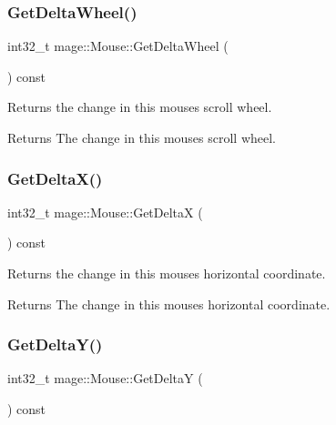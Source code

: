 \subsubsection{\texorpdfstring{Get\+Delta\+Wheel()}{GetDeltaWheel()}}
{\footnotesize\ttfamily int32\+\_\+t mage\+::\+Mouse\+::\+Get\+Delta\+Wheel (\begin{DoxyParamCaption}{ }\end{DoxyParamCaption}) const\hspace{0.3cm}{\ttfamily [noexcept]}}

Returns the change in this mouse\textquotesingle{}s scroll wheel.

\begin{DoxyReturn}{Returns}
The change in this mouse\textquotesingle{}s scroll wheel. 
\end{DoxyReturn}
\hypertarget{classmage_1_1_mouse_a9adb29bd36a28d6caf26017954a5cf7f}{}\label{classmage_1_1_mouse_a9adb29bd36a28d6caf26017954a5cf7f} 
\subsubsection{\texorpdfstring{Get\+Delta\+X()}{GetDeltaX()}}
{\footnotesize\ttfamily int32\+\_\+t mage\+::\+Mouse\+::\+Get\+DeltaX (\begin{DoxyParamCaption}{ }\end{DoxyParamCaption}) const\hspace{0.3cm}{\ttfamily [noexcept]}}

Returns the change in this mouse\textquotesingle{}s horizontal coordinate.

\begin{DoxyReturn}{Returns}
The change in this mouse\textquotesingle{}s horizontal coordinate. 
\end{DoxyReturn}
\hypertarget{classmage_1_1_mouse_a0bf9de248294cacb4635e9eff5b2dc50}{}\label{classmage_1_1_mouse_a0bf9de248294cacb4635e9eff5b2dc50} 
\subsubsection{\texorpdfstring{Get\+Delta\+Y()}{GetDeltaY()}}
{\footnotesize\ttfamily int32\+\_\+t mage\+::\+Mouse\+::\+Get\+DeltaY (\begin{DoxyParamCaption}{ }\end{DoxyParamCaption}) const\hspace{0.3cm}{\ttfamily [noexcept]}}


